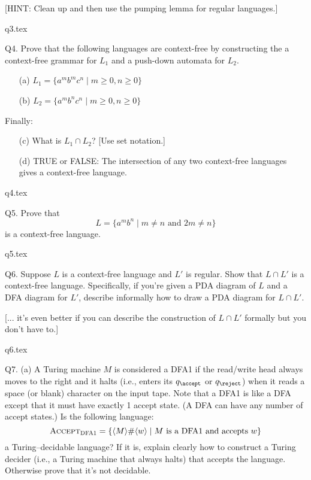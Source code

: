 [HINT: Clean up and then use the pumping lemma for regular languages.]

\SOLUTION

 {q3.tex}




\newpage
Q4. Prove that the following languages are context-free by constructing
the a context-free grammar for $L_1$ and a push-down automata for $L_2$.
\begin{enumerate}[topsep=0in,parsep=0in]
\item[(a)] $L_1 = \{a^m b^m c^n \mid m \geq 0, n \geq 0\}$
\item[(b)] $L_2 = \{a^m b^n c^n \mid m \geq 0, n \geq 0\}$
\end{enumerate}
Finally:
\begin{enumerate}[topsep=0in,parsep=0in]
\item[(c)] What is $L_1 \cap L_2$? [Use set notation.]
\item[(d)] TRUE or FALSE: The intersection of any two context-free languages
gives a context-free language.
\end{enumerate}


\SOLUTION

 {q4.tex}




\newpage
Q5. Prove that 
\[
L = 
\{
a^m b^n 
\mid
m \neq n \text{ and }
2m \neq n
\}
\]
is a context-free language.

\SOLUTION

 {q5.tex}




\newpage
Q6. Suppose $L$ is a context-free language and 
$L'$ is regular.
Show that $L \cap L'$ is a context-free language.
Specifically, if you're given a PDA
diagram of $L$ and a DFA diagram for $L'$,
describe informally how to draw a PDA diagram for $L \cap L'$.

[... it's even better if you can describe the construction of
$L \cap L'$ formally but you don't have to.]

\SOLUTION

 {q6.tex}




\newpage
\newcommand\ACCEPT{\operatorname{\text{\textsc{Accept}}}}
\newcommand\DFA{{\operatorname{\text{\textsc{DFA1}}}}}
\newcommand\NONEMPTY{\operatorname{\text{\textsc{NonEmpty}}}}
\newcommand\TM{{\operatorname{TM}}}

Q7. (a) A Turing machine $M$ is considered a DFA1 if
the read/write head always moves to the right and it halts
(i.e., enters its $q_\accept$ or $q_\reject$) when 
it reads a space (or blank) character on the input tape.
Note that a DFA1 is like a DFA except that it must have exactly 1
accept state.
(A DFA can have any number of accept states.)
Is the following language:
\[
\ACCEPT_\DFA 
= 
\{ \langle M \rangle \# \langle w \rangle 
\mid
M \text{ is a DFA1 and accepts } w \}
\]
a Turing--decidable language? 
If it is, explain clearly how to construct a Turing decider
(i.e., a Turing machine that always halts) that accepts
the language. Otherwise prove that it's not decidable.

